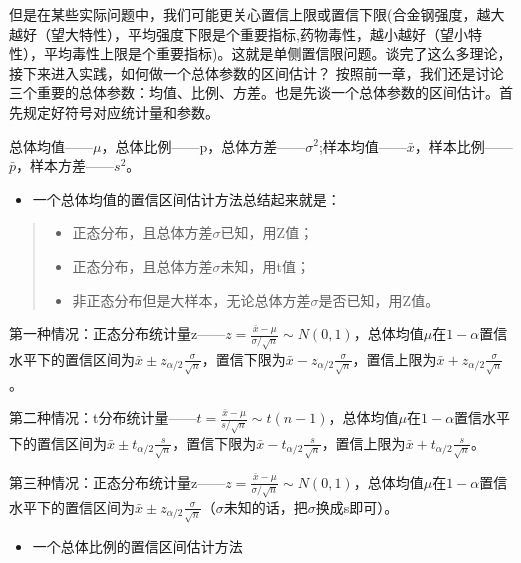 \documentclass[]{ctexbook}
\providecommand{\tightlist}{%
  \setlength{\itemsep}{0pt}\setlength{\parskip}{0pt}}
\begin{document}
但是在某些实际问题中，我们可能更关心置信上限或置信下限(合金钢强度，越大越好（望大特性），平均强度下限是个重要指标,药物毒性，越小越好（望小特性），平均毒性上限是个重要指标)。这就是单侧置信限问题。谈完了这么多理论，接下来进入实践，如何做一个总体参数的区间估计？
按照前一章，我们还是讨论三个重要的总体参数：均值、比例、方差。也是先谈一个总体参数的区间估计。首先规定好符号对应统计量和参数。

总体均值------\(\mu\)，总体比例------p，总体方差------\(\sigma^2\);样本均值------\(\bar x\)，样本比例------\(\bar p\)，样本方差------\(s^2\)。

\begin{itemize}
\tightlist
\item
  一个总体均值的置信区间估计方法总结起来就是：
\end{itemize}

\begin{quote}
\begin{itemize}
\tightlist
\item
  正态分布，且总体方差\(\sigma\)已知，用Z值；
\item
  正态分布，且总体方差\(\sigma\)未知，用t值；
\item
  非正态分布但是大样本，无论总体方差\(\sigma\)是否已知，用Z值。
\end{itemize}
\end{quote}

第一种情况：正态分布统计量z------\(z=\frac{\bar x-\mu}{\sigma/\sqrt{n}}\sim N(0,1)\)，总体均值\(\mu\)在\(1-\alpha\)置信水平下的置信区间为\(\bar x\pm z_{\alpha/2}\frac{\sigma}{\sqrt{n}}\)，置信下限为\(\bar x- z_{\alpha/2}\frac{\sigma}{\sqrt{n}}\)，置信上限为\(\bar x+ z_{\alpha/2}\frac{\sigma}{\sqrt{n}}\)。

第二种情况：t分布统计量------\(t=\frac{\bar x-\mu}{s/\sqrt{n}}\sim t(n-1)\)，总体均值\(\mu\)在\(1-\alpha\)置信水平下的置信区间为\(\bar x\pm t_{\alpha/2}\frac{s}{\sqrt{n}}\)，置信下限为\(\bar x- t_{\alpha/2}\frac{s}{\sqrt{n}}\)，置信上限为\(\bar x+ t_{\alpha/2}\frac{s}{\sqrt{n}}\)。

第三种情况：正态分布统计量z------\(z=\frac{\bar x-\mu}{\sigma/\sqrt{n}}\sim N(0,1)\)，总体均值\(\mu\)在\(1-\alpha\)置信水平下的置信区间为\(\bar x\pm z_{\alpha/2}\frac{\sigma}{\sqrt{n}}\)（\(\sigma\)未知的话，把\(\sigma\)换成s即可）。

\begin{itemize}
\tightlist
\item
  一个总体比例的置信区间估计方法
\end{itemize}
\end{document}
